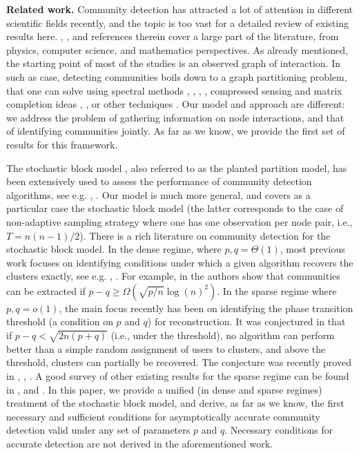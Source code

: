 \documentclass[12pt]{colt}%
\begin{document}
\medskip
\noindent
{\bf Related work.} Community detection has attracted a lot of attention in different scientific fields recently, and the topic is too vast for a detailed review of existing results here. \cite{newman2013}, \cite{coja2010}, \cite{mossel2013} and references therein cover a large part of the literature, from physics, computer science, and mathematics perspectives. As already mentioned, the starting point of most of the studies is an observed graph of interaction. In such as case, detecting communities boils down to a graph partitioning problem, that one can solve using spectral methods \cite{boppana1987eigenvalues}, \cite{mcsherry2001spectral}, \cite{dasgupta2006spectral}, \cite{chaudhuri2012spectral}, compressed sensing and matrix completion ideas \cite{chen2012}, \cite{chatterjee2012}, or other techniques \cite{Jerrum1998155}. Our model and approach are different: we address the problem of gathering information on node interactions, and that of identifying communities jointly. As far as we know, we provide the first set of results for this framework. 

The stochastic block model \cite{holland1983}, also referred to as the planted partition model, has been extensively used to assess the performance of community detection algorithms, see e.g. \cite{rohe2011}, \cite{decelle2011}. Our model is much more general, and covers as a particular case the stochastic block model (the latter corresponds to the case of non-adaptive sampling strategy where one has one observation per node pair, i.e., $T=n(n-1)/2$). There is a rich literature on community detection for the stochastic block model. In the dense regime, where $p,q=\Theta(1)$, most previous work focuses on identifying conditions under which a given algorithm recovers the clusters exactly, see e.g. \cite{mcsherry2001spectral}, \cite{condon2001}. For example, in \cite{chen2012} the authors show that communities can be extracted if $p-q\ge \Omega(\sqrt{p/n}\log(n)^2)$. In the sparse regime where $p,q=o(1)$, the main focus recently has been on identifying the phase transition threshold (a condition on $p$ and $q$) for reconstruction. It was conjectured in \cite{decelle2011} that if $p-q<\sqrt{2n(p+q)}$ (i.e., under the threshold), no algorithm can perform better than a simple random assignment of users to clusters, and above the threshold, clusters can partially be recovered. The conjecture was recently proved in \cite{mossel2012stochastic}, \cite{massoulie2013}, \cite{mossel2013}. A good survey of other existing results for the sparse regime can be found in \cite{coja2010}, and \cite{chen2012}. In this paper, we provide a unified (in dense and sparse regimes) treatment of the stochastic block model, and derive, as far as we know, the first necessary and sufficient conditions for asymptotically accurate community detection valid under any set of parameters $p$ and $q$. Necessary conditions for accurate detection are not derived in the aforementioned work. 
\end{document}
